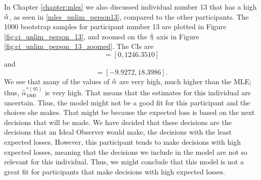 In Chapter \ref{chapter:mles} we also discussed individual number 13 that has a high $\hat{\alpha}$, as seen in \eqref{mles_unlim_person13}, compared to the other participants. The 1000 bootstrap samples for participant number 13 are plotted in Figure \ref{fig:ci_unlim_person_13}, and zoomed on the $\hat{\eta}$ axis in Figure \ref{fig:ci_unlim_person_13_zoomed}. The CIs are
\begin{equation*}
    [\hat{\alpha}^{*(5)}_{1000},\hat{\alpha}^{*(95)}_{1000}] = [0,1246.3510]
\end{equation*}
and
\begin{equation*}
    [\hat{\eta}^{*(5)}_{1000},\hat{\eta}^{*(95)}_{1000}] = [-9.9272,18.3986].
\end{equation*}
We see that many of the values of $\hat{\alpha}$ are very high, much higher than the MLE; thus, $\hat{\alpha}^{*(95)}_{1000}$ is very high. That means that the estimates for this individual are uncertain. Thus, the model might not be a good fit for this participant and the choices she makes. That might be because the expected loss is based on the next decisions that will be made. We have decided that these decisions are the decisions that an Ideal Observer would make, the decisions with the least expected losses. However, this participant tends to make decisions with high expected losses, meaning that the decisions we include in the model are not so relevant for this individual. Thus, we might conclude that this model is not a great fit for participants that make decisions with high expected losses. 
